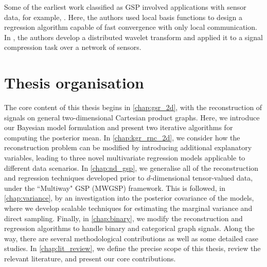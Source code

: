 Some of the earliest work classified as GSP involved applications with sensor data, for example, \cite{Guestrin2004}. Here, the authors used local basis functions to design a regression algorithm capable of fast convergence with only local communication. In \cite{Wagner2005}, the authors develop a distributed wavelet transform and applied it to a signal compression task over a network of sensors. 

\section{Thesis organisation}

The core content of this thesis begins in \cref{chap:gsr_2d}, with the reconstruction of signals on general two-dimensional Cartesian product graphs. Here, we introduce our Bayesian model formulation and present two iterative algorithms for computing the posterior mean. In \cref{chap:kgr_rnc_2d}, we consider how the reconstruction problem can be modified by introducing additional explanatory variables, leading to three novel multivariate regression models applicable to different data scenarios. In \cref{chap:nd_gsp}, we generalise all of the reconstruction and regression techniques developed prior to $d$-dimensional tensor-valued data, under the ``Multiway" GSP (MWGSP) framework. This is followed, in \cref{chap:variance}, by an investigation into the posterior covariance of the models, where we develop scalable techniques for estimating the marginal variance and direct sampling. Finally, in \cref{chap:binary}, we modify the reconstruction and regression algorithms to handle binary and categorical graph signals. Along the way, there are several methodological contributions as well as some detailed case studies. In \cref{chap:lit_review}, we define the precise scope of this thesis, review the relevant literature, and present our core contributions. 

